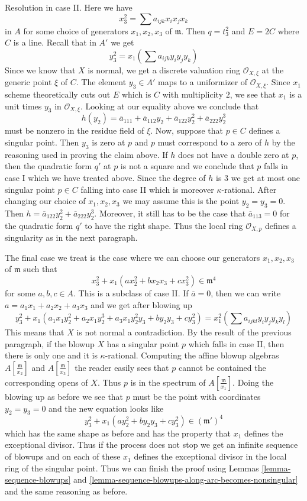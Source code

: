 \medskip\noindent
Resolution in case II. Here we have
$$
x_3^2 = \sum a_{ijk}x_ix_jx_k
$$
in $A$ for some choice of generators $x_1, x_2, x_3$ of $\mathfrak m$.
Then $q = t_3^2$ and $E = 2C$ where $C$ is a line.
Recall that in $A'$ we get
$$
y_3^2 = x_1(\sum a_{ijk} y_iy_jy_k)
$$
Since we know that $X$ is normal, we get a discrete valuation
ring $\mathcal{O}_{X, \xi}$ at the generic point $\xi$ of $C$.
The element $y_3 \in A'$ maps to a uniformizer of $\mathcal{O}_{X, \xi}$.
Since $x_1$ scheme theoretically cuts out $E$
which is $C$ with multiplicity $2$, we see that
$x_1$ is a unit times $y_3$ in $\mathcal{O}_{X, \xi}$. Looking
at our equality above we conclude that
$$
h(y_2) = \overline{a}_{111} + \overline{a}_{112} y_2 +
\overline{a}_{122} y_2^2 +
\overline{a}_{222} y_2^3
$$
must be nonzero in the residue field of $\xi$.
Now, suppose that $p \in C$ defines a singular point.
Then $y_3$ is zero at $p$ and $p$ must correspond to a
zero of $h$ by the reasoning used in proving the claim above.
If $h$ does not have a double zero at $p$, then the quadratic
form $q'$ at $p$ is not a square and we conclude that $p$
falls in case I which we have treated above.
Since the degree of $h$ is $3$ we
get at most one singular point $p \in C$ falling into case II
which is moreover $\kappa$-rational. After changing our
choice of $x_1, x_2, x_3$ we may assume this is the point
$y_2 = y_3 = 0$.
Then $h = \overline{a}_{122} y_2^2 + \overline{a}_{222} y_2^3$.
Moreover, it still has to be the case that
$\overline{a}_{113} = 0$ for the quadratic form $q'$ to have
the right shape.
Thus the local ring $\mathcal{O}_{X, p}$ defines a singularity
as in the next paragraph.

\medskip\noindent
The final case we treat is the case where we can choose our generators
$x_1, x_2, x_3$ of $\mathfrak m$ such that
$$
x_3^2 + x_1(a x_2^2 + b x_2x_3 + c x_3^2) \in \mathfrak m^4
$$
for some $a, b, c \in A$. This is a subclass of case II. If
$\overline{a} = 0$, then we can write
$a = a_1 x_1 + a_2 x_2 + a_3 x_3$ and we get after blowing up
$$
y_3^2 + x_1(a_1 x_1 y_2^2 + a_2 x_1 y_2^3 + a_3 x_1 y_2^2 y_3 +
b y_2 y_3 + c y_3^2) = x_1^2 (\sum a_{ijkl}y_iy_jy_ky_l)
$$
This means that $X$ is not normal a contradiction. By the result
of the previous paragraph, if the blowup $X$
has a singular point $p$ which falls in case II, then
there is only one and it is $\kappa$-rational.
Computing the affine blowup algebras
$A[\frac{\mathfrak m}{x_2}]$ and $A[\frac{\mathfrak m}{x_3}]$
the reader easily sees that $p$ cannot be contained
the corresponding opens of $X$. Thus $p$ is in the spectrum
of $A[\frac{\mathfrak m}{x_1}]$. Doing the blowing up as before we see that
$p$ must be the point with coordinates $y_2 = y_3 = 0$ and the new
equation looks like
$$
y_3^2 + x_1(a y_2^2 + b y_2 y_3 + c y_3^2) \in (\mathfrak m')^4
$$
which has the same shape as before and has the property
that $x_1$ defines the exceptional divisor. Thus if the process
does not stop we get an infinite sequence of blowups and on
each of these $x_1$ defines the exceptional divisor in the
local ring of the singular point. Thus we can
finish the proof using
Lemmas \ref{lemma-sequence-blowups} and
\ref{lemma-sequence-blowups-along-arc-becomes-nonsingular}
and the same reasoning as before.

